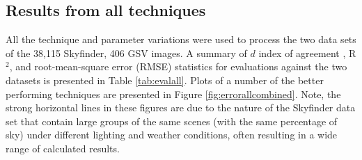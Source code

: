 \documentclass[final,3p,times,authoryear]{elsarticle}
\begin{document}
\subsection{Results from all techniques}\label{sec:resultsall}
All the technique and parameter variations were used to process the two data sets of the 38,115 Skyfinder, 406 GSV images. A summary of $d$ index of agreement \citep{Willmott1981}, R$^{2}$, and root-mean-square error (RMSE) statistics for evaluations against the two datasets is presented in Table \ref{tab:evalall}. Plots of a number of the better performing techniques are presented in Figure \ref{fig:errorallcombined}. Note, the strong horizontal lines in these figures are due to the nature of the Skyfinder data set that contain large groups of the same scenes (with the same percentage of sky) under different lighting and weather conditions, often resulting in a wide range of calculated results.
\end{document}
